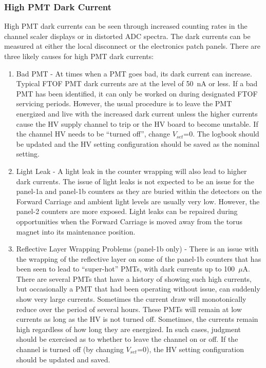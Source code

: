 \documentclass[12pt]{article}
\begin{document}
\subsubsection{High PMT Dark Current}
\label{high-current}

High PMT dark currents can be seen through increased counting rates in the channel 
scaler displays or in distorted ADC spectra. The dark currents can be measured at 
either the local disconnect or the electronics patch panels. There are three likely 
causes for high PMT dark currents:

\begin{enumerate}
\item Bad PMT - At times when a PMT goes bad, its dark current can increase. Typical 
FTOF PMT dark currents are at the level of 50~nA or less. If a bad PMT has been 
identified, it can only be worked on during designated FTOF servicing periods. However, 
the usual procedure is to leave the PMT energized and live with the increased dark 
current unless the higher currents cause the HV supply channel to trip or the HV
board to become unstable. If the channel HV needs to be ``turned off'', change
$V_{set}$=0. The logbook should be updated and the HV setting configuration should be 
saved as the nominal setting.
\item Light Leak - A light leak in the counter wrapping will also lead to higher dark 
currents. The issue of light leaks is not expected to be an issue for the panel-1a and 
panel-1b counters as they are buried within the detectors on the Forward Carriage and 
ambient light levels are usually very low. However, the panel-2 counters are more 
exposed. Light leaks can be repaired during opportunities when the Forward Carriage is 
moved away from the torus magnet into its maintenance position.
\item Reflective Layer Wrapping Problems (panel-1b only) - There is an issue with the 
wrapping of the reflective layer on some of the panel-1b counters that has been seen to 
lead to ``super-hot'' PMTs, with dark currents up to 100~$\mu$A. There are several PMTs 
that have a history of showing such high currents, but occasionally a PMT that had been 
operating without issue, can suddenly show very large currents. Sometimes the current 
draw will monotonically reduce over the period of several hours. These PMTs will remain 
at low currents as long as the HV is not turned off. Sometimes, the currents remain high 
regardless of how long they are energized. In such cases, judgment should be exercised 
as to whether to leave the channel on or off. If the channel is turned off (by
changing $V_{set}$=0), the HV setting configuration should be updated and saved.
\end{enumerate}
\end{document}

